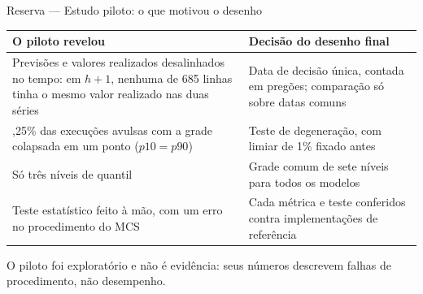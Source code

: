 \documentclass[aspectratio=169,10pt]{beamer}
\newcommand{\hum}{\(h{+}1\)}
\begin{document}
\begin{frame}{Reserva --- Estudo piloto: o que motivou o desenho}
  \small
  \begin{tabular}{>{\raggedright\arraybackslash}p{}
                  >{\raggedright\arraybackslash}p{}}
    \toprule
    \textbf{O piloto revelou} & \textbf{Decisão do desenho final} \\
    \midrule
    Previsões e valores realizados desalinhados no tempo: em \hum, nenhuma
    de 685 linhas tinha o mesmo valor realizado nas duas séries
    & Data de decisão única, contada em pregões; comparação só sobre datas comuns \\
    \addlinespace
    91,25\% das execuções avulsas com a grade colapsada em um ponto (\(p10 = p90\))
    & Teste de degeneração, com limiar de 1\% fixado antes \\
    \addlinespace
    Só três níveis de quantil
    & Grade comum de sete níveis para todos os modelos \\
    \addlinespace
    Teste estatístico feito à mão, com um erro no procedimento do MCS
    & Cada métrica e teste conferidos contra implementações de referência \\
    \bottomrule
  \end{tabular}

  \vspace{2pt}
  \alert{O piloto foi exploratório e não é evidência}: seus números descrevem falhas de
  procedimento, não desempenho.
\end{frame}
\end{document}
